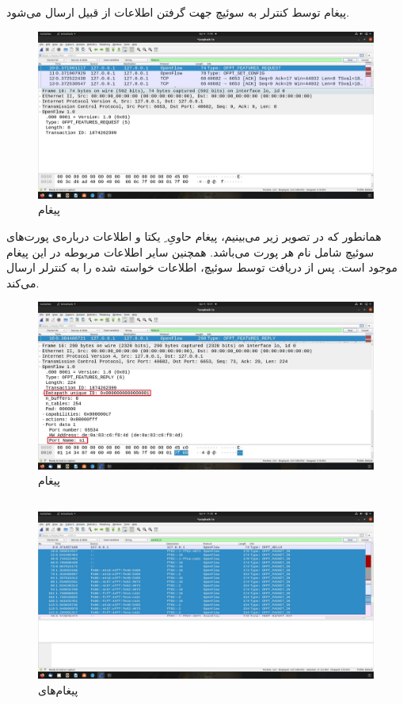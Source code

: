 \documentclass{article}
\begin{document}
پیغام  توسط کنترلر به سوئیچ جهت گرفتن اطلاعات از قبیل  ارسال می‌شود.
\begin{figure}[H]
    \centering
    \includegraphics[width=1.0\textwidth]{figures/1e.jpg}
    \caption
	{
پیغام 
	}
    \label{fig:fig1}
\end{figure}
همانطور که در تصویر زیر می‌بینیم، پیغام  حاویِ ِ یکتا و اطلاعات درباره‌ی پورت‌های سوئیچ شامل نام هر پورت می‌باشد. همچنین سایر اطلاعات مربوطه در این پیغام موجود است. پس از دریافت  توسط سوئیچ، اطلاعات خواسته شده را به کنترلر ارسال می‌کند.
\begin{figure}[H]
    \centering
    \includegraphics[width=1.0\textwidth]{figures/1d.jpg}
    \caption
	{
پیغام 
	}
    \label{fig:fig1}
\end{figure}

\subsection{}
\begin{figure}[H]
    \centering
    \includegraphics[width=1.0\textwidth]{figures/1f.jpg}
    \caption
	{
پیغام‌های 
	}
    \label{fig:fig1}
\end{figure}
\end{document}
